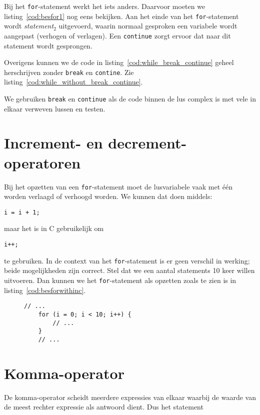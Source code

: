 Bij het \texttt{for}-statement werkt het iets anders. Daarvoor moeten we listing~\ref{cod:besfor1} nog eens bekijken. Aan het einde van het \texttt{for}-statement wordt \textsl{statement$_2$} uitgevoerd, waarin normaal gesproken een variabele wordt aangepast (verhogen of verlagen). Een \texttt{continue} zorgt ervoor dat naar dit statement wordt gesprongen.


Overigens kunnen we de code in listing~\ref{cod:while_break_continue} geheel herschrijven zonder \texttt{break} en \texttt{contine}. Zie listing~\ref{cod:while_without_break_continue}.


We gebruiken \texttt{break} en \texttt{continue} als de code binnen de lus complex is met vele in elkaar verweven lussen en testen.


\section{Increment- en decrement-operatoren}
Bij het opzetten van een \texttt{for}-statement moet de lusvariabele vaak met één worden verlaagd of verhoogd worden. We kunnen dat doen middels:

\hspace*{1em}\texttt{i = i + 1;}

maar het is in C gebruikelijk om

\hspace*{1em}\texttt{i++;}

te gebruiken. In de context van het \texttt{for}-statement is er geen verschil in werking; beide mogelijkheden zijn correct. Stel dat we een aantal statements 10 keer willen uitvoeren. Dan kunnen we het \texttt{for}-statement als opzetten zoals te zien is in listing~\ref{cod:besforwithinc}.

\begin{figure}[!ht]
\begin{lstlisting}[caption=Gebruik van de increment-operator in een \texttt{for}-statement.,label=cod:besforwithinc]
    // ...
    for (i = 0; i < 10; i++) {
        // ...
    }
    // ...
\end{lstlisting}
\end{figure}


\section{Komma-operator}
\indexfunc{,}
De komma-operator scheidt meerdere expressies van elkaar waarbij de waarde van de meest rechter expressie als antwoord dient. Dus het statement

